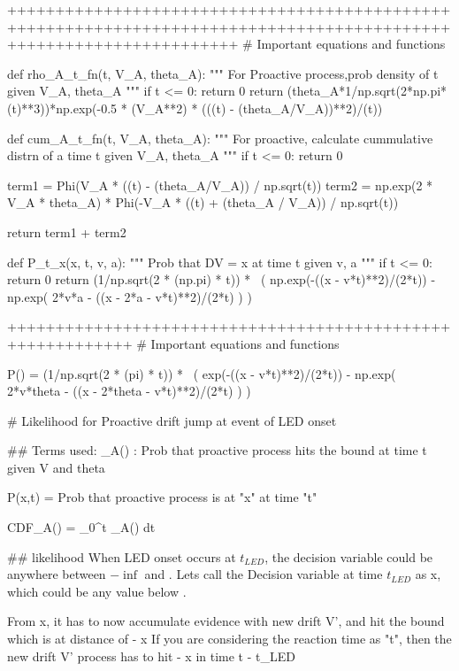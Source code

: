  
++++++++++++++++++++++++++++++++++++++++++++++++++++++++++++++++++++++++++++++++++++++++++++++++++++++++++++++++++++
# Important equations and functions

def rho_A_t_fn(t, V_A, theta_A):
    """
    For Proactive process,prob density of t given V_A, theta_A
    """
    if t <= 0:
        return 0
    return (theta_A*1/np.sqrt(2*np.pi*(t)**3))*np.exp(-0.5 * (V_A**2) * (((t) - (theta_A/V_A))**2)/(t))


def cum_A_t_fn(t, V_A, theta_A):
        """
        For proactive, calculate cummulative distrn of a time t given V_A, theta_A
        """
        if t <= 0:
        return 0

        term1 = Phi(V_A * ((t) - (theta_A/V_A)) / np.sqrt(t))
        term2 = np.exp(2 * V_A * theta_A) * Phi(-V_A * ((t) + (theta_A / V_A)) / np.sqrt(t))
        
        return term1 + term2

def P_t_x(x, t, v, a):
    """
    Prob that DV = x at time t given v, a 
    """
    if t <= 0:
        return 0
    return (1/np.sqrt(2 * (np.pi) * t)) * \
        ( np.exp(-((x - v*t)**2)/(2*t)) - np.exp( 2*v*a - ((x - 2*a - v*t)**2)/(2*t) ) )

+++++++++++++++++++++++++++++++++++++++++++++++++++++++++++
# Important equations and functions

P()  =  (1/np.sqrt(2 * (pi) * t)) * \
        ( exp(-((x - v*t)**2)/(2*t)) - np.exp( 2*v*theta - ((x - 2*theta - v*t)**2)/(2*t) ) )


        

# Likelihood for Proactive drift jump at event of LED onset


## Terms used: 
\rho_A() : Prob that proactive process hits the bound at time t given V and theta

P(x,t) = Prob that proactive process is at "x" at time "t"

CDF_A() = \int_{0}^{t} \rho_A() dt

## likelihood 
When LED onset occurs at $ t_{LED} $, the decision variable could be anywhere between $-\inf$ and \theta. 
Lets call the Decision variable at time $ t_{LED} $ as x, which could be any value below \theta.

From x, it has to now accumulate evidence with new drift V', and hit the bound which is at distance of \theta - x
If you are considering the reaction time as "t", then the new drift V' process has to hit \theta - x in time t - t_{LED}


